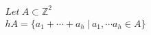 \documentclass[preview]{standalone}
\begin{document}
\begin{align*}
Let\     A    \subset\mathbb{Z}^2  \\hA=\{a_1+\cdots+a_h\ |\ a_1,\cdots a_h\in A\}
\end{align*}
\end{document}

